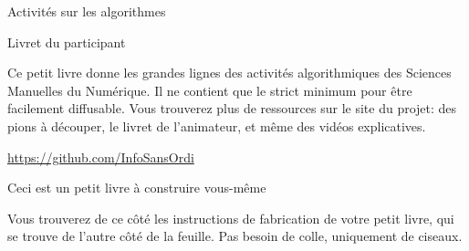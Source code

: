 \documentclass[a4paper,12pt]{article}
\begin{document}
\begin{center}
  {\Huge Activités sur les algorithmes}

  \bigskip
  {\Large Livret du participant}
  \vspace{-\baselineskip}
\end{center}

\large

Ce petit livre donne les grandes lignes des activités algorithmiques des
Sciences Manuelles du Numérique. Il ne contient que le strict minimum
pour être facilement diffusable. Vous trouverez plus de ressources sur
le site du projet: des pions à découper, le livret de l'animateur, et
même des vidéos explicatives.

\centerline{\color{blue}\url{https://github.com/InfoSansOrdi}}

\bigskip\bigskip

\centerline{\Large Ceci est un petit livre à construire vous-même}


Vous trouverez de ce côté les instructions de fabrication de votre
petit livre, qui se trouve de l'autre côté de la feuille. Pas besoin
de colle, uniquement de ciseaux.

\bigskip\bigskip
\end{document}
